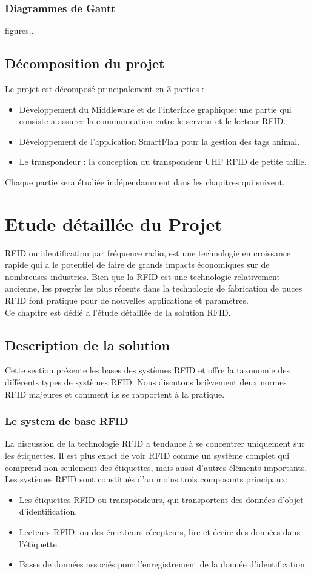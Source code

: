 \documentclass[11pt, a4paper, twoside]{book}
\begin{document}
\subsection{Diagrammes	de	Gantt}
figures...
\section{Décomposition du projet}
Le projet est décomposé principalement en 3 parties :
\begin{itemize}
\item Développement du Middleware et de l'interface graphique: une partie qui consiste a assurer la communication entre le serveur et le lecteur RFID.
\item Développement de l'application SmartFlah pour la gestion des tags animal.
\item Le transpondeur : la conception du transpondeur UHF RFID de petite taille.\\
\end{itemize}

Chaque partie sera étudiée indépendamment dans les chapitres qui suivent.

\chapter{Etude	détaillée du Projet}
RFID ou identification par fréquence radio, est une technologie en croissance rapide qui a le potentiel de faire de grands impacts économiques sur de nombreuses industries. Bien que la RFID est une technologie relativement ancienne, les progrès les plus récents dans la technologie de fabrication de puces RFID font pratique pour de nouvelles applications et paramètres.\\
Ce chapitre est dédié a l'étude	 détaillée de la solution RFID.
\section{Description de la solution}
Cette section présente les bases des systèmes RFID et offre la taxonomie des différents types de systèmes RFID. Nous discutons brièvement deux normes RFID majeures et comment ils se rapportent à la pratique.
\subsection{Le system de base RFID}
La discussion de la technologie RFID a tendance à se concentrer uniquement sur les étiquettes. Il est plus exact de voir RFID comme un système complet qui comprend non seulement des étiquettes, mais aussi d'autres éléments importants. Les systèmes RFID sont constitués d'au moins trois composants principaux:
\begin{itemize}
\item Les étiquettes RFID ou transpondeurs, qui transportent des données d'objet d'identification.
\item Lecteurs RFID, ou des émetteurs-récepteurs, lire et écrire des données dans l'étiquette.
\item Bases de données associés pour l'enregistrement de la donnée d'identification\\
\end{itemize}
\end{document}
